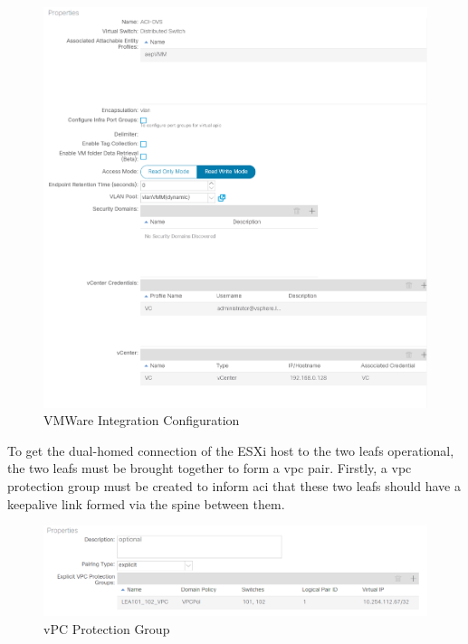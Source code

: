 \begin{figure}[H]
    
    \centering
    \includegraphics[scale=0.6]{images/vmm-integration.png}
    
    \caption{VMWare Integration Configuration}
    \label{fig:vmm-integration}
\end{figure}

To get the dual-homed connection of the ESXi host to the two leafs operational,
the two leafs must be brought together to form a \gls{vpc} pair.
Firstly, a \gls{vpc} protection group must be created to inform \gls{aci} that
these two leafs should have a keepalive link formed via the spine between them.
\begin{figure}[H]
    
    \centering
    \includegraphics[scale=0.7]{images/vpc-protection.png}
    
    \caption{vPC Protection Group}
    \label{fig:vpc-protection}
\end{figure}

